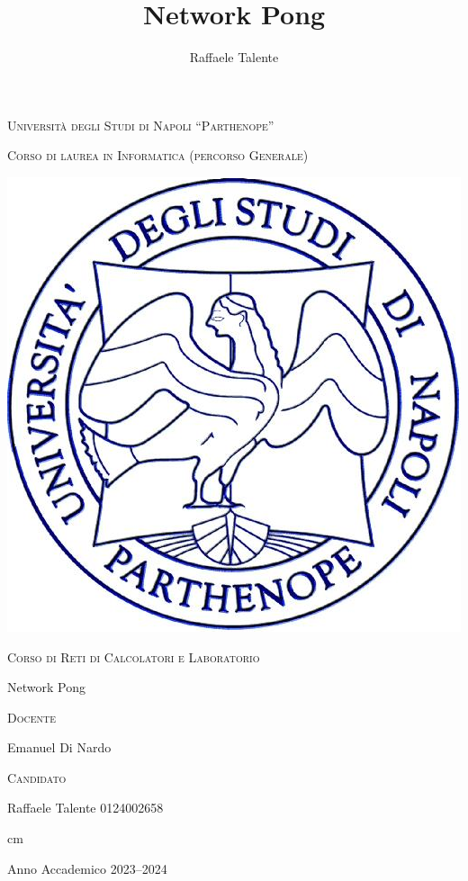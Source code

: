 \documentclass[11pt,italian,a4paper,oneside,openright]{article}
\title{Network Pong}
\author{Raffaele Talente}
\begin{document}
    \vskip 1cm \large \centerline{\textsc{Università degli Studi di
    Napoli ``Parthenope''}}

    \centerline {\small\textsc{Corso di laurea in Informatica
        (percorso Generale)}}

    \begin{center}
        \includegraphics[scale=0.24]{logo_parthenope}
    \end{center}

    \vskip 0.5cm

    \large \centerline {\textsc{Corso di Reti di Calcolatori e Laboratorio}}

    \vskip 0.5cm

    \Large \centerline {Network Pong}


    \vskip 4.5cm


    \large
    \begin{minipage}[t]{7cm}
        \textsc{Docente}

        Emanuel Di Nardo\\

    \end{minipage}
    \hfill
    \begin{minipage}[t]{5cm}
        \hfill \textsc{Candidato}

        \hfill Raffaele Talente
        \hfill 0124002658
    \end{minipage}

     cm \Large \centerline {Anno Accademico 2023--2024}
    \vfill \eject

    \tableofcontents

    \newpage

    
    
    
    
    

    \newpage
    \pagestyle{plain}
\end{document}
